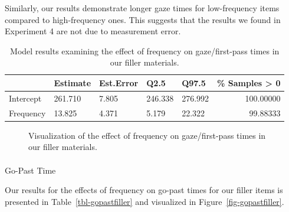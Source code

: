 \documentclass[
  12pt,
  letterpaper,
]{scrreprt}
\makeatletter
\let\oldparagraph\paragraph
\renewcommand{\paragraph}{
    \@ifstar
      \xxxParagraphStar
      \xxxParagraphNoStar
  }
\newcommand{\xxxParagraphStar}[1]{\oldparagraph*{#1}\mbox{}}
\newcommand{\xxxParagraphNoStar}[1]{\oldparagraph{#1}\mbox{}}
\makeatother
\begin{document}
Similarly, our results demonstrate longer gaze times for low-frequency
items compared to high-frequency ones. This suggests that the results we
found in Experiment 4 are not due to measurement error.

\begin{longtable}[]{@{}lllllr@{}}

\caption{\label{tbl-gazefiller}Model results examining the effect of
frequency on gaze/first-pass times in our filler materials.}

\tabularnewline

\toprule\noalign{}
& Estimate & Est.Error & Q2.5 & Q97.5 & \% Samples \textgreater{} 0 \\
\midrule\noalign{}
\endhead
\bottomrule\noalign{}
\endlastfoot
Intercept & 261.710 & 7.805 & 246.338 & 276.992 & 100.00000 \\
Frequency & 13.825 & 4.371 & 5.179 & 22.322 & 99.88333 \\

\end{longtable}

\begin{figure}[htbp]

\caption{\label{fig-gazefiller}Visualization of the effect of frequency
on gaze/first-pass times in our filler materials.}


\end{figure}%

\paragraph{Go-Past Time}\label{go-past-time-2}

Our results for the effects of frequency on go-past times for our filler
items is presented in Table~\ref{tbl-gopastfiller} and visualized in
Figure~\ref{fig-gopastfiller}.
\end{document}
